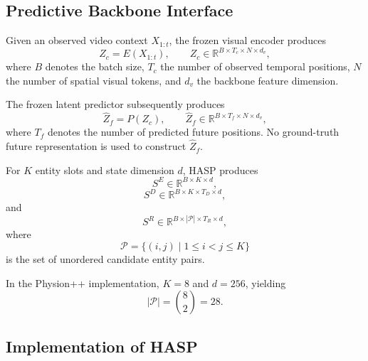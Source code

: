 \documentclass{article}
\begin{document}
\subsection{Predictive Backbone Interface}
\label{app:backbone-detail}

Given an observed video context $X_{1:t}$, the frozen visual encoder produces
\begin{equation}
    Z_c = E(X_{1:t}),
    \qquad
    Z_c
    \in
    \mathbb{R}^{B \times T_c \times N \times d_v},
    \label{eq:app-encoder}
\end{equation}
where $B$ denotes the batch size, $T_c$ the number of observed temporal positions, $N$ the number of spatial visual tokens, and $d_v$ the backbone feature dimension.

The frozen latent predictor subsequently produces
\begin{equation}
    \widehat Z_f = P(Z_c),
    \qquad
    \widehat Z_f
    \in
    \mathbb{R}^{B \times T_f \times N \times d_v},
    \label{eq:app-predictor}
\end{equation}
where $T_f$ denotes the number of predicted future positions. No ground-truth future representation is used to construct $\widehat Z_f$.

For $K$ entity slots and state dimension $d$, HASP produces
\begin{equation}
    S^E
    \in
    \mathbb{R}^{B\times K\times d},
\end{equation}
\begin{equation}
    S^D
    \in
    \mathbb{R}^{B\times K\times T_D\times d},
\end{equation}
and
\begin{equation}
    S^R
    \in
    \mathbb{R}^{B\times |\mathcal P|\times T_R\times d},
\end{equation}
where
\begin{equation}
    \mathcal P
    =
    \{(i,j)\mid 1\leq i<j\leq K\}
\end{equation}
is the set of unordered candidate entity pairs.

In the Physion++ implementation, $K=8$ and $d=256$, yielding
\begin{equation}
    |\mathcal P|=\binom{8}{2}=28.
\end{equation}

\subsection{Implementation of HASP}
\label{app:hasp-detail}
\end{document}
